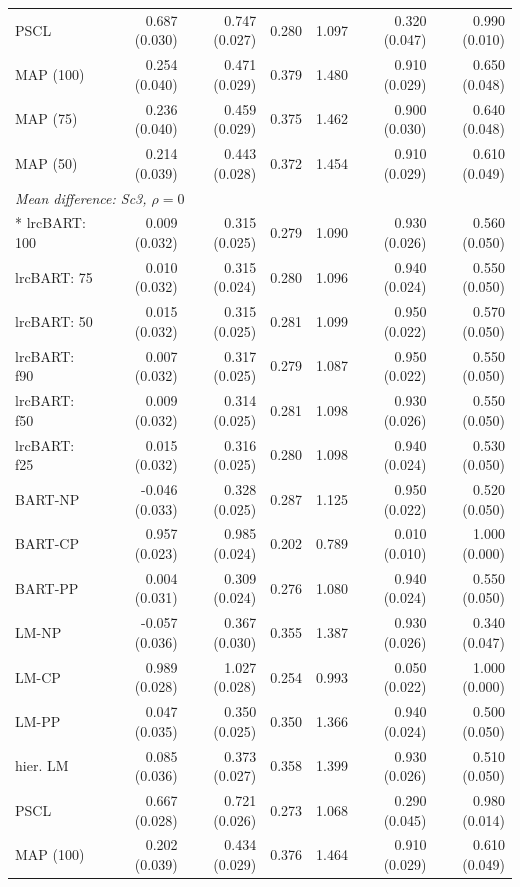 \begin{landscape}
\begin{longtable}{lrrrrrr}
PSCL & 0.687 (0.030) & 0.747 (0.027) & 0.280 & 1.097 & 0.320 (0.047) & 0.990 (0.010) \\
MAP (100) & 0.254 (0.040) & 0.471 (0.029) & 0.379 & 1.480 & 0.910 (0.029) & 0.650 (0.048) \\
MAP (75) & 0.236 (0.040) & 0.459 (0.029) & 0.375 & 1.462 & 0.900 (0.030) & 0.640 (0.048) \\
MAP (50) & 0.214 (0.039) & 0.443 (0.028) & 0.372 & 1.454 & 0.910 (0.029) & 0.610 (0.049) \\
\multicolumn{7}{l}{\strut\textit{Mean difference: Sc3, $\rho=0$}}\\*
lrcBART: 100 & 0.009 (0.032) & 0.315 (0.025) & 0.279 & 1.090 & 0.930 (0.026) & 0.560 (0.050) \\
lrcBART: 75 & 0.010 (0.032) & 0.315 (0.024) & 0.280 & 1.096 & 0.940 (0.024) & 0.550 (0.050) \\
lrcBART: 50 & 0.015 (0.032) & 0.315 (0.025) & 0.281 & 1.099 & 0.950 (0.022) & 0.570 (0.050) \\
lrcBART: f90 & 0.007 (0.032) & 0.317 (0.025) & 0.279 & 1.087 & 0.950 (0.022) & 0.550 (0.050) \\
lrcBART: f50 & 0.009 (0.032) & 0.314 (0.025) & 0.281 & 1.098 & 0.930 (0.026) & 0.550 (0.050) \\
lrcBART: f25 & 0.015 (0.032) & 0.316 (0.025) & 0.280 & 1.098 & 0.940 (0.024) & 0.530 (0.050) \\
BART-NP & -0.046 (0.033) & 0.328 (0.025) & 0.287 & 1.125 & 0.950 (0.022) & 0.520 (0.050) \\
BART-CP & 0.957 (0.023) & 0.985 (0.024) & 0.202 & 0.789 & 0.010 (0.010) & 1.000 (0.000) \\
BART-PP & 0.004 (0.031) & 0.309 (0.024) & 0.276 & 1.080 & 0.940 (0.024) & 0.550 (0.050) \\
LM-NP & -0.057 (0.036) & 0.367 (0.030) & 0.355 & 1.387 & 0.930 (0.026) & 0.340 (0.047) \\
LM-CP & 0.989 (0.028) & 1.027 (0.028) & 0.254 & 0.993 & 0.050 (0.022) & 1.000 (0.000) \\
LM-PP & 0.047 (0.035) & 0.350 (0.025) & 0.350 & 1.366 & 0.940 (0.024) & 0.500 (0.050) \\
hier. LM & 0.085 (0.036) & 0.373 (0.027) & 0.358 & 1.399 & 0.930 (0.026) & 0.510 (0.050) \\
PSCL & 0.667 (0.028) & 0.721 (0.026) & 0.273 & 1.068 & 0.290 (0.045) & 0.980 (0.014) \\
MAP (100) & 0.202 (0.039) & 0.434 (0.029) & 0.376 & 1.464 & 0.910 (0.029) & 0.610 (0.049) \\

\end{longtable}
\end{landscape}
